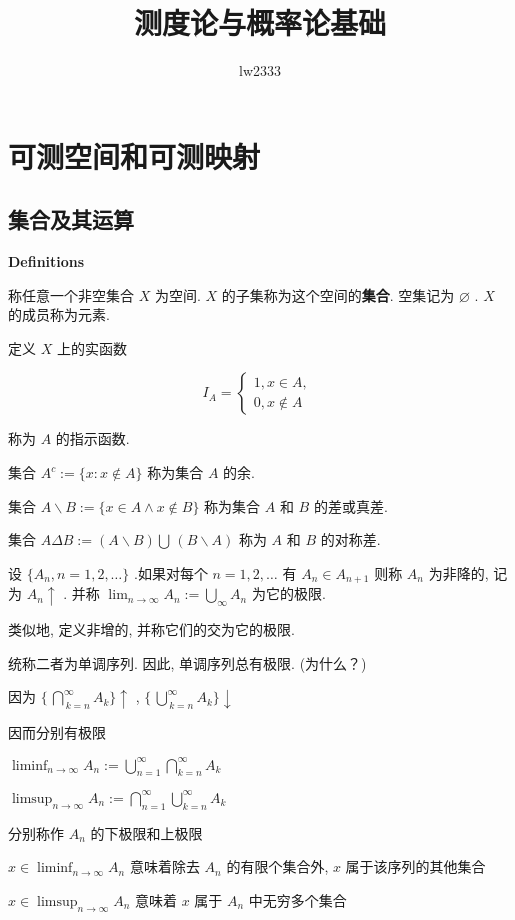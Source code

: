 \documentclass[UTF8]{book}
\title{测度论与概率论基础}
\author{lw2333}
\begin{document}
\maketitle

\chapter{可测空间和可测映射}

\newpage
\section{集合及其运算}
\textbf{Definitions}

称任意一个非空集合 $ X $ 为空间. $ X $ 的子集称为这个空间的\textbf{集合}.
空集记为{ $ \varnothing $ }.  $ X $  的成员称为元素.

定义 $ X $ 上的实函数\par
 $$ 
    I_A = \left\{
    \begin{array}{l}
        1,x\in A, \\
        0,x\notin A
    \end{array} \right. \
 $$ \par
称为 $ A $ 的指示函数.\par
集合 $ A^c := \{x:x\notin A\} $ 称为集合 $ A $ 的余.\par
集合 $ A\backslash B:=\{x\in A\wedge x\notin B\} $ 称为集合 $ A $ 和 $ B $ 的差或真差.\par
集合 $ A\Delta B:=(A\backslash B) \bigcup\, (B\backslash A) $ 称为 $ A $ 和 $ B $ 的对称差.\par
设 $ \{A_n,n=1,2,\ldots\} $ .如果对每个 $ n=1,2,\ldots $ 有 $ A_n \in A_{n+1} $ 则称 $ A_n $ 为非降的, 记为 $ A_n\uparrow $ .
并称 $ \lim_{n\to \infty}A_n:=\bigcup_{\infty}A_n  $ 为它的极限.\par
类似地, 定义非增的, 并称它们的交为它的极限. \par

统称二者为单调序列. 因此, 单调序列总有极限. (为什么？)\par
因为 $ \{\,\bigcap_{\,k=n}^{\infty}A_k\}\uparrow $ ,  $ \{\,\bigcup_{\,k=n}^{\infty}A_k\}\downarrow $ \par
因而分别有极限\par
 $ \liminf_{n\to \infty} A_n := \bigcup_{n=1}^\infty \bigcap_{k=n}^\infty A_k $ \par
 $ \limsup_{n\to \infty} A_n := \bigcap_{n=1}^\infty \bigcup_{k=n}^\infty A_k $  \par
分别称作 $ A_n $ 的下极限和上极限\par
 $ x\in \liminf_{n\to \infty} A_n $ 意味着除去 $ A_n $ 的有限个集合外,  $ x $ 属于该序列的其他集合\par
 $ x\in \limsup_{n\to \infty} A_n $ 意味着 $ x $ 属于 $ A_n $ 中无穷多个集合\par
\end{document}
